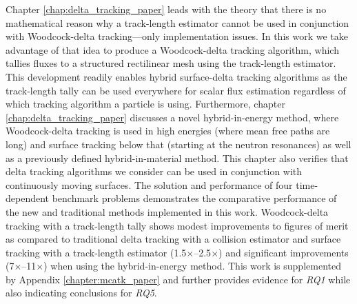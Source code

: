 Chapter \ref{chap:delta_tracking_paper} leads with the theory that there is no mathematical reason why a track-length estimator cannot be used in conjunction with Woodcock-delta tracking---only implementation issues. 
In this work we take advantage of that idea to produce a Woodcock-delta tracking algorithm, which tallies fluxes to a structured rectilinear mesh using the track-length estimator.
This development readily enables hybrid surface-delta tracking algorithms as the track-length tally can be used everywhere for scalar flux estimation regardless of which tracking algorithm a particle is using.
Furthermore, chapter \ref{chap:delta_tracking_paper} discusses a novel hybrid-in-energy method, where Woodcock-delta tracking is used in high energies (where mean free paths are long) and surface tracking below that (starting at the neutron resonances) as well as a previously defined hybrid-in-material method.
This chapter also verifies that delta tracking algorithms we consider can be used in conjunction with continuously moving surfaces.
The solution and performance of four time-dependent benchmark problems demonstrates the comparative performance of the new and traditional methods implemented in this work.
Woodcock-delta tracking with a track-length tally shows modest improvements to figures of merit as compared to traditional delta tracking with a collision estimator and surface tracking with a track-length estimator (\num{1.5}$\times$--\num{2.5}$\times$) and significant improvements (\num{7}$\times$--\num{11}$\times$) when using the hybrid-in-energy method.
This work is supplemented by Appendix \ref{chapter:mcatk_paper} and further provides evidence for \emph{RQ1} while also indicating conclusions for \emph{RQ5}.